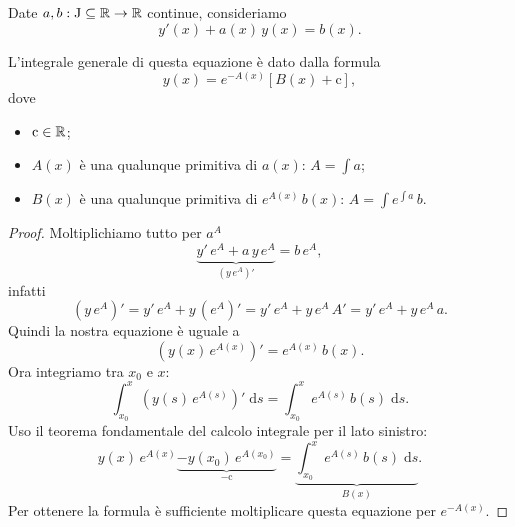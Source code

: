 \documentclass[../../analisi2]{subfiles}
\begin{document}
        \begin{teorema}
            Date \(a, b : \mathrm{J} \subseteq \mathbb{R} \to \mathbb{R}\) continue, consideriamo
            \[
                y'(x) + a(x) \, y(x) = b(x).
            \]

            L'integrale generale di questa equazione è dato dalla formula
            \[
                y(x) = e^{-A(x)} \left[B(x) + \mathrm{c}\right],
            \]
            dove
            \begin{itemize}
                \item \(\mathrm{c} \in \mathbb{R}\);
                \item \(A(x)\) è una qualunque primitiva di \(a(x)\): \(A = \int \! a\);
                \item \(B(x)\) è una qualunque primitiva di \(e^{A(x)} \, b(x)\): \(A = \int \! e^{\int \! a} \, b\).
            \end{itemize}
        \end{teorema}
        \begin{proof}
            Moltiplichiamo tutto per \(a^A\)
            \[
                \underbrace{y' \, e^A + a \, y \, e^A}_{\left(y \, e^A\right)'} = b \, e^A,
            \]
            infatti
            \[
                \left(y \, e^A\right)' = y' \, e^A + y \, \left(e^A\right)' = y' \, e^A + y \, e^A \, A' = y' \, e^A + y \, e^A \, a.
            \]
            Quindi la nostra equazione è uguale a
            \[
                \left(y(x) \, e^{A(x)}\right)' = e^{A(x)} \, b(x).
            \]
            Ora integriamo tra \(x_0\) e \(x\):
            \[
                \int_{x_0}^x \! \left(y(s) \, e^{A(s)}\right)' \; \mathrm{d}s = \int_{x_0}^{x} \! e^{A(s)} \, b(s) \; \mathrm{d}s.
            \]
            Uso il teorema fondamentale del calcolo integrale per il lato sinistro:
            \[
                y(x) \, e^{A(x)} \underbrace{- y(x_0) \, e^{A(x_0)}}_{- \mathrm{c}} = \underbrace{\int_{x_0}^x \! e^{A(s)} \, b(s) \; \mathrm{d}s}_{B(x)}.
            \]
            Per ottenere la formula è sufficiente moltiplicare questa equazione per \(e^{-A(x)}\).
        \end{proof}
            
\end{document}
